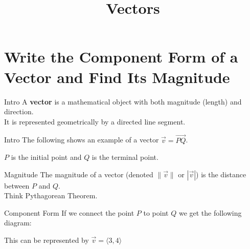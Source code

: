 \documentclass[t,usenames,dvipsnames]{beamer}
\title{Vectors}
\author{}
\date{}
\begin{document}
\begin{frame}
    \titlepage
\end{frame}

\section{Write the Component Form of a Vector and Find Its Magnitude}

\begin{frame}{Intro}
A {\color{blue}\textbf{vector}} is a mathematical object with both magnitude (length) and direction. \newline\\

It is represented geometrically by a directed line segment.
\end{frame}

\begin{frame}{Intro}
The following shows an example of a vector $\vec{v} = \overrightarrow{PQ}$.   

\begin{center}
\end{center}

$P$ is the \alert{initial point} and $Q$ is the \alert{terminal point}.
\end{frame}

\begin{frame}{Magnitude}
The \alert{magnitude} of a vector (denoted $\lVert \vec{v} \rVert$ or $|\vec{v}|$) is the distance between $P$ and $Q$.    \newline\\

Think Pythagorean Theorem.
\end{frame}

\begin{frame}{Component Form}
    If we connect the point $P$ to point $Q$ we get the following diagram:
\begin{center}
\end{center}
\pause
This can be represented by $\vec{v} = \langle 3, 4 \rangle$
\end{frame}
\end{document}
